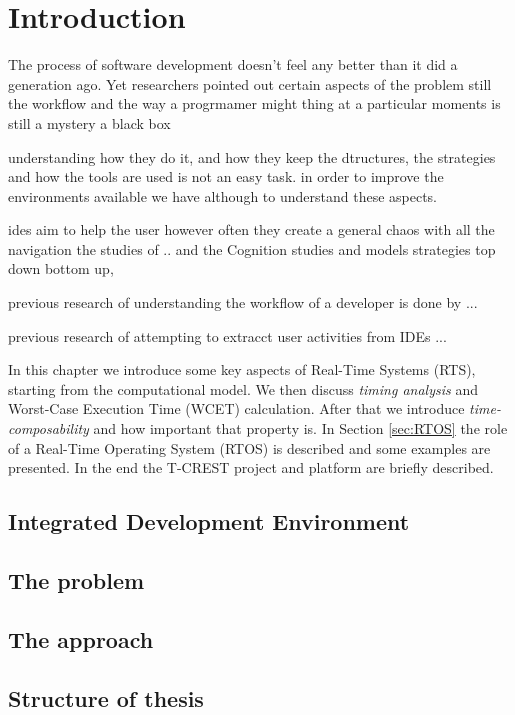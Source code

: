 \chapter{Introduction}

The process of software development doesn't feel any better than it did a generation ago. Yet researchers pointed out certain aspects of the problem still the workflow and the way a progrmamer might thing at a particular moments is still a mystery a black box 

understanding how they do it, and how they keep the dtructures, the strategies and how the tools are used is not an easy task. in order to improve the environments available we have although to understand these aspects.

ides aim to help the user however often they create a general chaos with all the navigation the studies of .. and the Cognition studies and models strategies top down bottom up, 

previous research of understanding the workflow of a developer is done by ... 

previous research of attempting to extracct user activities from IDEs ... 

In this chapter we introduce some key aspects of Real-Time Systems (RTS), starting from the computational model. We then discuss \textit{timing analysis} and Worst-Case Execution Time (WCET) calculation. After that we introduce \textit{time-composability} and how important that property is. In Section \ref{sec:RTOS} the role of a Real-Time Operating System (RTOS) is described and some examples are presented. In the end the T-CREST project and platform are briefly described.

\section{Integrated Development Environment}
\section{The problem}
\section{The approach}
\section{Structure of thesis}
